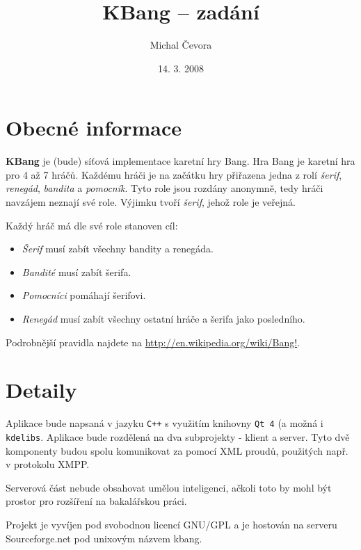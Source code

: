 \documentclass[a4paper,11pt]{article}
\title{KBang -- zadání}
\author{Michal Čevora}
\date{14. 3. 2008}
\begin{document}
\maketitle

\section*{Obecné informace}

\textbf{KBang} je (bude) síťová implementace karetní hry Bang. Hra Bang je karetní hra pro 4 až 7 hráčů. Každému hráči
je na začátku hry přiřazena jedna z rolí \textit{šerif}, \textit{renegád}, \textit{bandita} a \textit{pomocník}. Tyto role
jsou rozdány anonymně, tedy hráči navzájem neznají své role. Výjimku tvoří \textit{šerif}, jehož role je veřejná.

Každý hráč má dle své role stanoven cíl:
\begin{itemize}
\item \textit{Šerif} musí zabít všechny bandity a renegáda.
\item \textit{Bandité} musí zabít šerifa.
\item \textit{Pomocníci} pomáhají šerifovi.
\item \textit{Renegád} musí zabít všechny ostatní hráče a šerifa jako posledního.
\end{itemize}

Podrobnější pravidla najdete na \url{http://en.wikipedia.org/wiki/Bang!}.

\section*{Detaily}
Aplikace bude napsaná v jazyku \texttt{C++} s využitím knihovny \texttt{Qt 4} (a možná i \texttt{kdelibs}. Aplikace bude rozdělená na
dva subprojekty - klient a server. Tyto dvě komponenty budou spolu komunikovat za pomocí XML proudů, použitých např. v protokolu XMPP.

Serverová část nebude obsahovat umělou inteligenci, ačkoli toto by mohl být prostor pro rozšíření na bakalářskou práci.

Projekt je vyvíjen pod svobodnou licencí GNU/GPL a je hostován na serveru Sourceforge.net pod unixovým názvem kbang.
\end{document}
